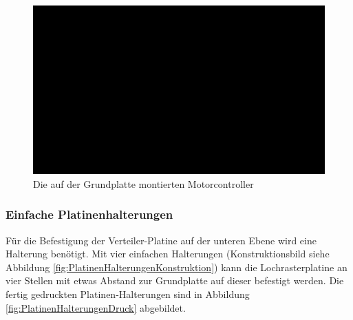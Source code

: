 \begin{figure}[H] %
\includegraphics[width=.85\textwidth]{sec2/images/3DAnbaukomponenten/Montagebilder/MotorcontrollerHalterungMontage} 
\centering
\captionsetup{width=.95\textwidth}
\caption[Die auf der Grundplatte montierten Motorcontroller]{Die auf der Grundplatte montierten Motorcontroller}
\centering
\label{fig:MotorcontrollerHalterungMontage}
\end{figure}

\newpage

\subsubsection{Einfache Platinenhalterungen}\label{Sec2Sub2SubSub5}

Für die Befestigung der Verteiler-Platine auf der unteren Ebene wird eine Halterung benötigt. Mit vier einfachen Halterungen (Konstruktionsbild siehe Abbildung \ref{fig:PlatinenHalterungenKonstruktion}) kann die Lochrasterplatine an vier Stellen mit etwas Abstand zur Grundplatte auf dieser befestigt werden. Die fertig gedruckten Platinen-Halterungen sind in Abbildung \ref{fig:PlatinenHalterungenDruck} abgebildet.

